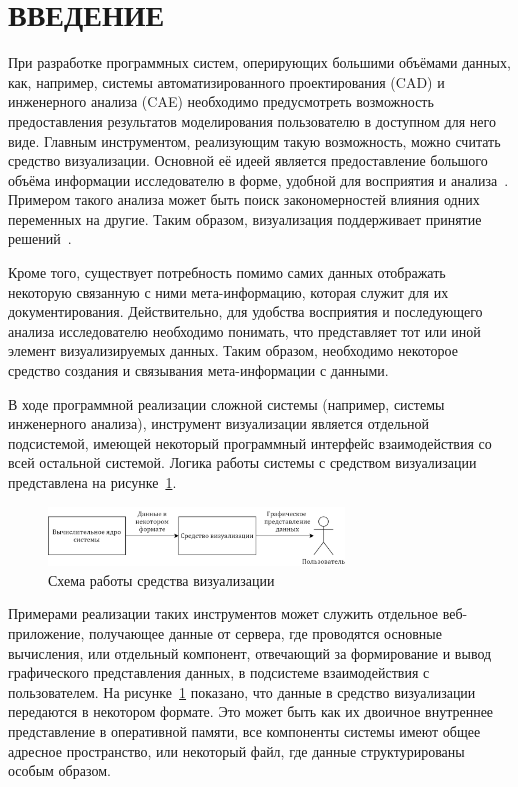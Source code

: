 \chapter*{ВВЕДЕНИЕ}\label{chap.introduction}

При разработке программных систем, оперирующих большими объёмами данных, как, например, системы автоматизированного проектирования (CAD) и инженерного анализа (CAE) необходимо предусмотреть возможность предоставления результатов моделирования пользователю в доступном для него виде. Главным инструментом, реализующим такую возможность, можно считать средство визуализации. Основной её идеей является предоставление большого объёма информации исследователю в форме, удобной для восприятия и анализа~\cite{Berch2017}. Примером такого анализа может быть поиск закономерностей влияния одних переменных на другие. Таким образом, визуализация поддерживает принятие решений~\cite{RomVisualization2016}.

Кроме того, существует потребность помимо самих данных отображать некоторую связанную с ними мета-информацию, которая служит для их документирования. Действительно, для удобства восприятия и последующего анализа исследователю необходимо понимать, что представляет тот или иной элемент визуализируемых данных. Таким образом, необходимо некоторое средство создания и связывания мета-информации с данными.

В ходе программной реализации сложной системы (например, системы инженерного анализа), инструмент визуализации является отдельной подсистемой, имеющей некоторый программный интерфейс взаимодействия со всей остальной системой. Логика работы системы с средством визуализации представлена на рисунке~\ref{fig:visSystemStructure}.

\begin{figure}[!ht]
    \centering
    \includegraphics[width=0.7\textwidth]{figures/structure.visualizationSystem.png}
    \caption{Схема работы средства визуализации}
    \label{fig:visSystemStructure}
\end{figure}

Примерами реализации таких инструментов может служить отдельное веб-приложение, получающее данные от сервера, где проводятся основные вычисления\cite{Xu2022}, или отдельный компонент, отвечающий за формирование и вывод графического представления данных, в подсистеме взаимодействия с пользователем. На рисунке~\ref{fig:visSystemStructure} показано, что данные в средство визуализации передаются в некотором формате. Это может быть как их двоичное внутреннее представление в оперативной памяти, все компоненты системы имеют общее адресное пространство, или некоторый файл, где данные структурированы особым образом.

